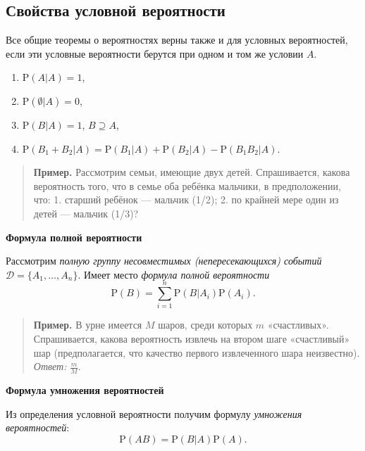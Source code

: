 \documentclass[11pt,a4paper]{article}
\providecommand{\tightlist}{%
      \setlength{\itemsep}{0pt}\setlength{\parskip}{0pt}}
\begin{document}
    \hypertarget{ux441ux432ux43eux439ux441ux442ux432ux430-ux443ux441ux43bux43eux432ux43dux43eux439-ux432ux435ux440ux43eux44fux442ux43dux43eux441ux442ux438}{%
\subsection{Свойства условной
вероятности}\label{ux441ux432ux43eux439ux441ux442ux432ux430-ux443ux441ux43bux43eux432ux43dux43eux439-ux432ux435ux440ux43eux44fux442ux43dux43eux441ux442ux438}}

Все общие теоремы о вероятностях верны также и для условных
вероятностей, если эти условные вероятности берутся при одном и том же
условии \(A\).

\begin{enumerate}
\def\labelenumi{\arabic{enumi}.}
\tightlist
\item
  \(\mathrm{P}(A|A) = 1\),
\item
  \(\mathrm{P}(\emptyset|A) = 0\),
\item
  \(\mathrm{P}(B|A) = 1\), \(B \supseteq A\),
\item
  \(\mathrm{P}(B_1 + B_2|A) = \mathrm{P}(B_1|A) + \mathrm{P}(B_2|A) - \mathrm{P}(B_1 B_2|A)\).
\end{enumerate}

\begin{quote}
\textbf{Пример.} Рассмотрим семьи, имеющие двух детей. Спрашивается,
какова вероятность того, что в семье оба ребёнка мальчики, в
предположении, что: 1. старший ребёнок --- мальчик (1/2); 2. по крайней
мере один из детей --- мальчик (1/3)?
\end{quote}

    \textbf{Формула полной вероятности}

Рассмотрим \emph{полную группу несовместимых (непересекающихся) событий}
\(\mathcal{D} = \{A_1, \dots, A_n\}\). Имеет место \emph{формула полной
вероятности}
\[ \mathrm{P}(B) = \sum_{i=1}^n \mathrm{P}(B|A_i) \mathrm{P}(A_i). \]

\begin{quote}
\textbf{Пример.} В урне имеется \(M\) шаров, среди которых \(m\)
«счастливых». Спрашивается, какова вероятность извлечь на втором шаге
«счастливый» шар (предполагается, что качество первого извлеченного шара
неизвестно).\\
\emph{Ответ:} \(\frac{m}{M}\).
\end{quote}

    \textbf{Формула умножения вероятностей}

Из определения условной вероятности получим формулу \emph{умножения
вероятностей}: \[ \mathrm{P}(AB) = \mathrm{P}(B|A) \mathrm{P}(A). \]
\end{document}
